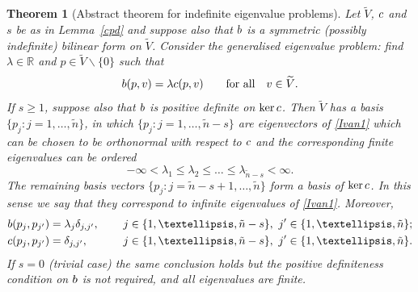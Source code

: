 \documentclass[10pt,a4paper]{amsart}
\newtheorem{theorem}{Theorem}
\newcommand{\txtb}{\textup{\texttt{b}}}
\newcommand{\txtc}{\textup{\texttt{c}}}
\newcommand{\wV}{\widetilde{V}}
\begin{document}
\begin{theorem}[Abstract theorem for indefinite eigenvalue problems]
\label{lem_ind_ev}
Let $\wV$, $\txtc$ and $s$ be 
as in Lemma~\ref{cpd} and suppose also that $\txtb$ is a symmetric \textup{(}possibly indefinite\textup{)} bilinear form on $\wV$. 
Consider the generalised eigenvalue problem: find $\lambda \in \mathbb{R}$ and $p \in \wV \backslash \{0\}$ such that 
\begin{equation} \label{Ivan1}
  \txtb(p,v)  = \lambda \txtc(p,v) \qquad \text{for all} \quad v \in \wV.
\end{equation}
If $s \ge 1$, suppose also that $\txtb$ is positive definite on $\ker\txtc$. 
Then  $\wV$ has a basis $\{p_j: j = 1, \ldots,\tilde n\}$,  in which  $\{p_j: j = 1, \ldots, \tilde n-s\}$ are eigenvectors of \eqref{Ivan1}  which
can be chosen to be orthonormal with respect to $\txtc$ and the corresponding finite eigenvalues can be ordered
\begin{equation} \label{Ivan11}
	-\infty < \lambda_1 \leq  \lambda_2 \leq   \ldots \leq \lambda_{\tilde n-s} < \infty. 
\end{equation} 
The remaining  basis vectors $\{p_j: j = \tilde n-s+1, \ldots, \tilde n\}$  form a basis of $\ker\txtc$. 
In this sense we say that they correspond to infinite  eigenvalues of \eqref{Ivan1}.
Moreover, 
\begin{alignat}{2}
	\txtb(p_j,p_{j'}) &= \lambda_j \delta_{j,j'}, \quad && \ j \in \{1, \ldots, \tilde n-s\}, \ j'\in\{1,\ldots,\tilde n\};
	\label{orth_b}
	\\
	\txtc(p_j,p_{j'}) &= \delta_{j,j'}, \quad && \ j\in\{1,\ldots,\tilde n-s\},\ j'\in\{1,\ldots,\tilde n\}.
	\label{orth_c}
\end{alignat}
If $s=0$ (trivial case) the same conclusion holds but the positive definiteness condition on $\txtb$ is not required, 
and all eigenvalues are finite.
\end{theorem}
\end{document}
